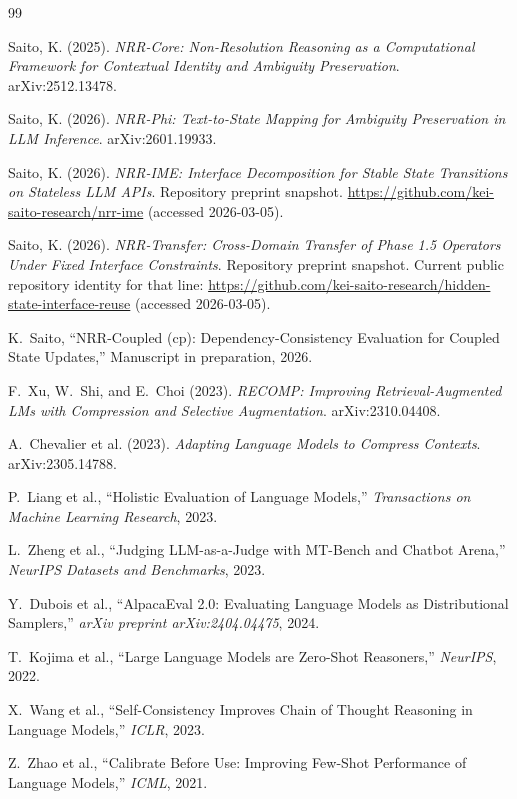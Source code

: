 \documentclass[11pt,a4paper]{article}
\begin{document}
\begin{thebibliography}{99}

Saito, K. (2025).
\textit{NRR-Core: Non-Resolution Reasoning as a Computational Framework for Contextual Identity and Ambiguity Preservation}.
arXiv:2512.13478.

Saito, K. (2026).
\textit{NRR-Phi: Text-to-State Mapping for Ambiguity Preservation in LLM Inference}.
arXiv:2601.19933.

Saito, K. (2026).
\textit{NRR-IME: Interface Decomposition for Stable State Transitions on Stateless LLM APIs}.
Repository preprint snapshot. \url{https://github.com/kei-saito-research/nrr-ime} (accessed 2026-03-05).

Saito, K. (2026).
\textit{NRR-Transfer: Cross-Domain Transfer of Phase 1.5 Operators Under Fixed Interface Constraints}.
Repository preprint snapshot. Current public repository identity for that line: \url{https://github.com/kei-saito-research/hidden-state-interface-reuse} (accessed 2026-03-05).

K.~Saito,
\newblock ``NRR-Coupled (cp): Dependency-Consistency Evaluation for Coupled State Updates,''
\newblock Manuscript in preparation, 2026.

F.~Xu, W.~Shi, and E.~Choi (2023).
\textit{RECOMP: Improving Retrieval-Augmented LMs with Compression and Selective Augmentation}.
arXiv:2310.04408.

A.~Chevalier et al. (2023).
\textit{Adapting Language Models to Compress Contexts}.
arXiv:2305.14788.

P.~Liang et al.,
\newblock ``Holistic Evaluation of Language Models,''
\newblock \emph{Transactions on Machine Learning Research}, 2023.

L.~Zheng et al.,
\newblock ``Judging LLM-as-a-Judge with MT-Bench and Chatbot Arena,''
\newblock \emph{NeurIPS Datasets and Benchmarks}, 2023.

Y.~Dubois et al.,
\newblock ``AlpacaEval 2.0: Evaluating Language Models as Distributional Samplers,''
\newblock \emph{arXiv preprint arXiv:2404.04475}, 2024.

T.~Kojima et al.,
\newblock ``Large Language Models are Zero-Shot Reasoners,''
\newblock \emph{NeurIPS}, 2022.

X.~Wang et al.,
\newblock ``Self-Consistency Improves Chain of Thought Reasoning in Language Models,''
\newblock \emph{ICLR}, 2023.

Z.~Zhao et al.,
\newblock ``Calibrate Before Use: Improving Few-Shot Performance of Language Models,''
\newblock \emph{ICML}, 2021.

\end{thebibliography}
\end{document}
